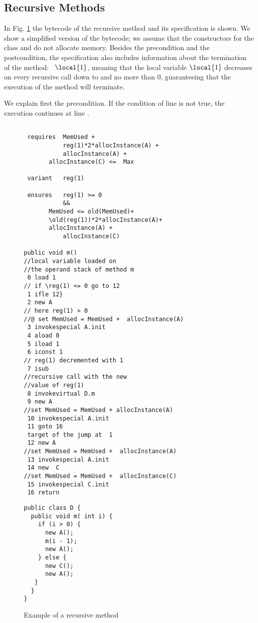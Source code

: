 \subsection{Recursive Methods} In Fig. \ref{recMeth} the bytecode of the recursive method \methodd{} and its specification is shown. 
 We show a simplified version of the bytecode; we assume that the constructors for the class  and 
 do not allocate memory. Besides the precondition and the postcondition, the specification also includes information 
 about the termination of the method: \variant\ $\local{1}$, meaning that the local variable $\local{1}$ decreases on every recursive call down to and no more than $0$, guaranteeing
 that the execution of the method will terminate.
 

We explain first the precondition. If the condition of line  is not true, the execution continues at line .

\begin{figure}[!hbp]

\begin{minipage}[c]{\linewidth}
\begin{lstlisting}[frame=trbl]

 requires  MemUsed +
           reg(1)*2*allocInstance(A) + 
           allocInstance(A) +
	   allocInstance(C) <=  Max 

 variant   reg(1) 

 ensures   reg(1) >= 0 
           &&
	   MemUsed <= old(MemUsed)+  
	   \old(reg(1))*2*allocInstance(A)+
	   allocInstance(A) + 
           allocInstance(C)
 
public void m()
//local variable loaded on 
//the operand stack of method m
 0 load 1
// if \reg(1) <= 0 go to 12
 1 ifle 12}
 2 new A 
// here reg(1) > 0 
//@ set MemUsed = MemUsed +  allocInstance(A)
 3 invokespecial A.init
 4 aload 0
 5 iload 1
 6 iconst 1
// reg(1) decremented with 1
 7 isub
//recursive call with the new 
//value of reg(1)
 8 invokevirtual D.m
 9 new A
//set MemUsed = MemUsed + allocInstance(A)
 10 invokespecial A.init
 11 goto 16
 target of the jump at  1
 12 new A
//set MemUsed = MemUsed +  allocInstance(A)
 13 invokespecial A.init
 14 new  C
//set MemUsed = MemUsed +  allocInstance(C)
 15 invokespecial C.init
 16 return
\end{lstlisting} 
\end{minipage}



\begin{minipage}[c]{\linewidth}%
\begin{lstlisting}[frame=trbl]
public class D {
  public void m( int i) {
    if (i > 0) {
      new A();
      m(i - 1);
      new A();
    } else {
      new C();
      new A();
   }
  }
}
\end{lstlisting} 
\end{minipage}
\caption{\sc Example of a recursive method}
 \label{recMeth}
\end{figure}

